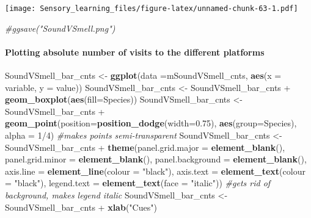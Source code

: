 \documentclass[]{article}
\newenvironment{Shaded}{\begin{snugshade}}{\end{snugshade}}
\newcommand{\KeywordTok}[1]{\textcolor[rgb]{0.13,0.29,0.53}{\textbf{{#1}}}}
\newcommand{\DataTypeTok}[1]{\textcolor[rgb]{0.13,0.29,0.53}{{#1}}}
\newcommand{\DecValTok}[1]{\textcolor[rgb]{0.00,0.00,0.81}{{#1}}}
\newcommand{\FloatTok}[1]{\textcolor[rgb]{0.00,0.00,0.81}{{#1}}}
\newcommand{\StringTok}[1]{\textcolor[rgb]{0.31,0.60,0.02}{{#1}}}
\newcommand{\CommentTok}[1]{\textcolor[rgb]{0.56,0.35,0.01}{\textit{{#1}}}}
\newcommand{\NormalTok}[1]{{#1}}
\let\oldparagraph\paragraph
\renewcommand{\paragraph}[1]{\oldparagraph{#1}\mbox{}}
\begin{document}
\texttt{[image: Sensory\_learning\_files/figure-latex/unnamed-chunk-63-1.pdf]}

\begin{Shaded}
\begin{Highlighting}[]
\CommentTok{#ggsave("SoundVSmell.png")}
\end{Highlighting}
\end{Shaded}

\paragraph{Plotting absolute number of visits to the different
platforms}\label{plotting-absolute-number-of-visits-to-the-different-platforms-2}

\begin{Shaded}
\begin{Highlighting}[]
\NormalTok{SoundVSmell_bar_cnts <-}\StringTok{ }\KeywordTok{ggplot}\NormalTok{(}\DataTypeTok{data =}\NormalTok{mSoundVSmell_cnts, }\KeywordTok{aes}\NormalTok{(}\DataTypeTok{x =} \NormalTok{variable, }\DataTypeTok{y =} \NormalTok{value))}
\NormalTok{SoundVSmell_bar_cnts <-}\StringTok{ }\NormalTok{SoundVSmell_bar_cnts +}\StringTok{ }\KeywordTok{geom_boxplot}\NormalTok{(}\KeywordTok{aes}\NormalTok{(}\DataTypeTok{fill=}\NormalTok{Species))}
\NormalTok{SoundVSmell_bar_cnts <-}\StringTok{ }\NormalTok{SoundVSmell_bar_cnts +}\StringTok{ }\KeywordTok{geom_point}\NormalTok{(}\DataTypeTok{position=}\KeywordTok{position_dodge}\NormalTok{(}\DataTypeTok{width=}\FloatTok{0.75}\NormalTok{), }\KeywordTok{aes}\NormalTok{(}\DataTypeTok{group=}\NormalTok{Species), }\DataTypeTok{alpha =} \DecValTok{1}\NormalTok{/}\DecValTok{4}\NormalTok{) }\CommentTok{#makes points semi-transparent}
\NormalTok{SoundVSmell_bar_cnts <-}\StringTok{ }\NormalTok{SoundVSmell_bar_cnts +}\StringTok{ }\KeywordTok{theme}\NormalTok{(}\DataTypeTok{panel.grid.major =} \KeywordTok{element_blank}\NormalTok{(), }\DataTypeTok{panel.grid.minor =} \KeywordTok{element_blank}\NormalTok{(),}
\DataTypeTok{panel.background =} \KeywordTok{element_blank}\NormalTok{(), }\DataTypeTok{axis.line =} \KeywordTok{element_line}\NormalTok{(}\DataTypeTok{colour =} \StringTok{"black"}\NormalTok{), }\DataTypeTok{axis.text =} \KeywordTok{element_text}\NormalTok{(}\DataTypeTok{colour =} \StringTok{"black"}\NormalTok{), }\DataTypeTok{legend.text =} \KeywordTok{element_text}\NormalTok{(}\DataTypeTok{face =} \StringTok{"italic"}\NormalTok{))  }\CommentTok{#gets rid of background, makes legend italic}
\NormalTok{SoundVSmell_bar_cnts <-}\StringTok{ }\NormalTok{SoundVSmell_bar_cnts +}\StringTok{ }\KeywordTok{xlab}\NormalTok{(}\StringTok{"Cues"}\NormalTok{)}

\end{Highlighting}
\end{Shaded}
\end{document}
